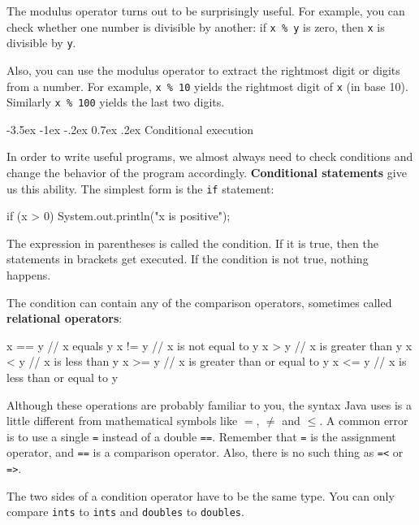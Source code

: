 \documentclass{book}
\makeatletter
\renewcommand{\section}{\@startsection 
    {section} {1} {0mm}%
    {-3.5ex \@plus -1ex \@minus -.2ex}%
    {0.7ex \@plus.2ex}%
    {\normalfont\Large\bfseries}}
\makeatother
\begin{document}
The modulus operator turns out to be surprisingly useful.  For
example, you can check whether one number is divisible by
another: if {\tt x \% y} is zero, then {\tt x} is divisible
by {\tt y}.

Also, you can use the modulus operator to extract the rightmost
digit or digits from a number.  For example, {\tt x \% 10} yields
the rightmost digit of {\tt x} (in base 10).  Similarly
{\tt x \% 100} yields the last two digits.


\section{Conditional execution}

In order to write useful programs, we almost always need
to check conditions and change the behavior of the program
accordingly.  {\bf Conditional statements} give us this ability.  The
simplest form is the {\tt if} statement:

\begin{verbatimtab}
    if (x > 0) {
      System.out.println("x is positive");
    }
\end{verbatimtab}
%
The expression in parentheses is called the condition.
If it is true, then the statements in brackets get executed.
If the condition is not true, nothing happens.


The condition can contain any of the comparison operators,
sometimes called {\bf relational operators}:

\begin{verbatimtab}
    x == y               // x equals y
    x != y               // x is not equal to y
    x > y                // x is greater than y
    x < y                // x is less than y
    x >= y               // x is greater than or equal to y
    x <= y               // x is less than or equal to y
\end{verbatimtab}
%
Although these operations are probably familiar to you, the
syntax Java uses is a little different from mathematical
symbols like $=$, $\neq$ and $\le$.  A common error is
to use a single {\tt =} instead of a double {\tt ==}.  Remember
that {\tt =} is the assignment operator, and {\tt ==} is
a comparison operator.  Also, there is no such thing as
{\tt =<} or {\tt =>}.

The two sides of a condition operator have to be the same
type.  You can only compare {\tt ints} to {\tt ints} and
{\tt doubles} to {\tt doubles}.
\end{document}
